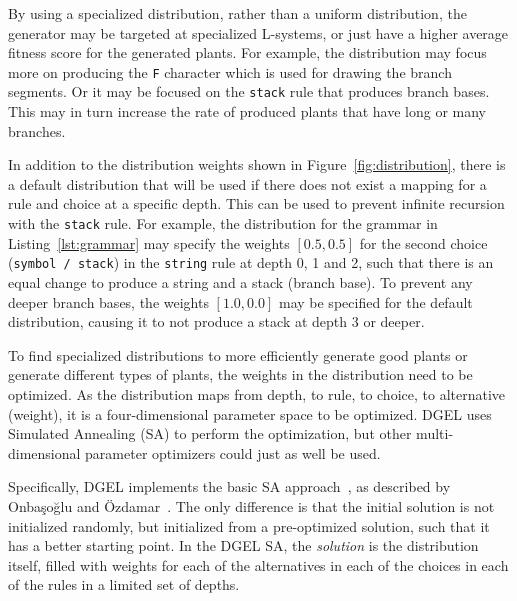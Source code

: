 By using a specialized distribution, rather than a uniform distribution, the generator may be targeted at specialized L-systems, or just have a higher average fitness score for the generated plants.
For example, the distribution may focus more on producing the \texttt{F} character which is used for drawing the branch segments.
Or it may be focused on the \texttt{stack} rule that produces branch bases.
This may in turn increase the rate of produced plants that have long or many branches.

In addition to the distribution weights shown in Figure~\ref{fig:distribution}, there is a default distribution that will be used if there does not exist a mapping for a rule and choice at a specific depth.
This can be used to prevent infinite recursion with the \texttt{stack} rule.
For example, the distribution for the grammar in Listing~\ref{lst:grammar} may specify the weights $[0.5, 0.5]$ for the second choice (\texttt{symbol / stack}) in the \texttt{string} rule at depth 0, 1 and 2, such that there is an equal change to produce a string and a stack (branch base).
To prevent any deeper branch bases, the weights $[1.0, 0.0]$ may be specified for the default distribution, causing it to not produce a stack at depth 3 or deeper.

To find specialized distributions to more efficiently generate good plants or generate different types of plants, the weights in the distribution need to be optimized.
As the distribution maps from depth, to rule, to choice, to alternative (weight), it is a four-dimensional parameter space to be optimized.
DGEL uses Simulated Annealing (SA) to perform the optimization, but other multi-dimensional parameter optimizers could just as well be used.

Specifically, DGEL implements the basic SA approach~\cite{2000Ozdamar}, as described by Onbaşoğlu and Özdamar~\cite{2001Onbasoglu}.
The only difference is that the initial solution is not initialized randomly, but initialized from a pre-optimized solution, such that it has a better starting point.
In the DGEL SA, the \textit{solution} is the distribution itself, filled with weights for each of the alternatives in each of the choices in each of the rules in a limited set of depths.

